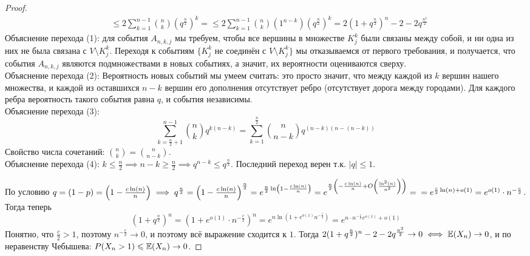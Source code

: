 \begin{proof}
\begin{align*}
        & \leq 2\sum\limits_{k = 1}^{n - 1} \binom{n}{k} \left(q^{\frac{n}{2}}\right)^k =
        \leq 2\sum\limits_{k = 1}^{n - 1} \binom{n}{k} (1^{n - k}) \left(q^{\frac{n}{2}}\right)^k
        = 2(1 + q^{\frac{n}{2}})^n - 2 - 2q^{\frac{n^2}{2}}
    \end{align*}
    Объяснение перехода (1): для события $A_{n, k, j}$ мы требуем, чтобы все вершины в множестве $K^k_j$
    были связаны между собой, и ни одна из них не была связана с $V \setminus K^k_j$. Переходя к событиям
    $\{ K^k_j \text{ не соединён с } V \setminus K^k_j \}$ мы отказываемся от первого требования, и получается,
    что события $A_{n, k, j}$ являются подмножествами в новых событиях, а значит, их вероятности оцениваются
    сверху.\\
    Объяснение перехода (2): Вероятность новых событий мы умеем считать: это просто значит, что между каждой
    из $k$ вершин нашего множества, и каждой из оставшихся $n - k$ вершин его дополнения отсутствует ребро
    (отсутствует дорога между городами). Для каждого ребра вероятность такого события равна $q$, и события
    независимы.\\
    Объяснение перехода (3):
    \[
        \sum\limits_{k = \frac{n}{2} + 1}^{n - 1} \binom{n}{k} q^{k(n - k)} =
        \sum\limits_{k = 1}^{\frac{n}{2}} \binom{n}{n - k} q^{(n - k)(n - (n - k))}
    \]
    Свойство числа сочетаний: $\binom{n}{k} = \binom{n}{n - k}$.\\
    Объяснение перехода (4): $k \leq \frac{n}{2} \implies n - k \geq \frac{n}{2} \implies
    q^{n - k} \leq q^{\frac{n}{2}}$. Последний переход верен т.к. $|q| \leq 1$.

    По условию $q = (1 - p) = \left( 1 - \frac{c\ln(n)}{n} \right) \implies q^{\frac{n}{2}} =
    \left( 1 - \frac{c\ln(n)}{n} \right)^{\frac{n}{2}} = e^{\frac{n}{2}\ln\left( 1 - \frac{c\ln(n)}{n} \right)}
    =e^{\frac{n}{2}\left( -\frac{c\ln(n)}{n} + O\left( \frac{\ln^2(n)}{n^2} \right) \right)} =\\
    =e^{\frac{c}{2}\ln(n) + o(1)} = e^{o(1)} \cdot n^{-\frac{c}{2}}$.\\
    Тогда теперь
    \[
        (1 + q^{\frac{n}{2}})^n = (1 + e^{o(1)} \cdot n^{-\frac{c}{2}})^n =
        e^{n\ln\left( 1 + e^{o(1)}n^{-\frac{c}{2}} \right)} =
        e^{n \cdot n^{-\frac{c}{2}}e^{o(1)} + o(1)}
    \]
    Понятно, что $\frac{c}{2} > 1$, поэтому $n^{-\frac{c}{2}} \to 0$, и поэтому всё выражение сходится к $1$.
    Тогда $2(1 + q^{\frac{n}{2}})^n - 2 - 2q^{\frac{n^2}{2}} \to 0 \iff \mathbb{E}(X_n) \to 0$,
    и по неравенству Чебышева: $P(X_n > 1) \leqslant \mathbb{E}(X_n) \to 0$.
\end{proof}
